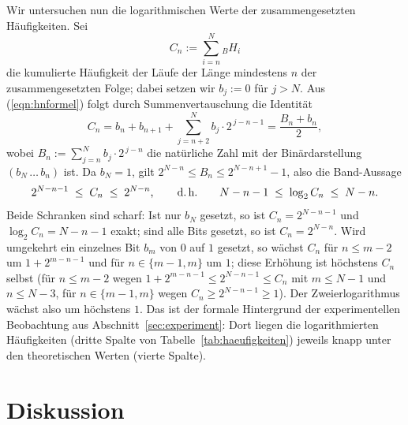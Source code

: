\documentclass[11pt,a4paper]{scrartcl}
\theoremstyle{plain}
\theoremstyle{definition}
\theoremstyle{remark}
\begin{document}
\noindent Wir untersuchen nun die logarithmischen Werte der
zusammengesetzten Häufigkeiten. Sei
\begin{equation}
  C_n:=\sum_{i=n}^{N} {_B}H_i
\end{equation}
die kumulierte Häufigkeit der Läufe der Länge mindestens $n$ der
zusammengesetzten Folge; dabei setzen wir $b_j:=0$ für $j>N$. Aus
(\ref{eqn:hnformel}) folgt durch Summenvertauschung die Identität
\begin{equation}\label{eqn:kumulatividentitaet}
  C_n
  = b_n + b_{n+1} + \sum_{j=n+2}^{N} b_j\cdot 2^{\,j-n-1}
  = \frac{B_n+b_n}{2},
\end{equation}
wobei $B_n:=\sum_{j=n}^{N} b_j\cdot 2^{\,j-n}$ die natürliche Zahl mit
der Binärdarstellung $(b_N\,\dots\,b_n)$ ist. Da $b_N=1$, gilt
$2^{N-n}\leq B_n\leq 2^{N-n+1}-1$, also die Band-Aussage
\begin{equation}\label{eqn:logband}
  2^{N-n-1}\;\leq\; C_n \;\leq\; 2^{N-n},
  \qquad\text{d.\,h.}\qquad
  N-n-1\;\leq\;\log_2 C_n\;\leq\;N-n.
\end{equation}
Beide Schranken sind scharf: Ist nur $b_N$ gesetzt, so ist
$C_n=2^{N-n-1}$ und $\log_2 C_n=N-n-1$ exakt; sind alle Bits gesetzt,
so ist $C_n=2^{N-n}$. Wird umgekehrt ein einzelnes Bit $b_m$ von $0$
auf $1$ gesetzt, so wächst $C_n$ für $n\leq m-2$ um
$1+2^{m-n-1}$ und für $n\in\{m-1,m\}$ um $1$; diese Erhöhung ist
höchstens $C_n$ selbst (für $n\leq m-2$ wegen
$1+2^{m-n-1}\leq 2^{N-n-1}\leq C_n$ mit $m\leq N-1$ und $n\leq N-3$,
für $n\in\{m-1,m\}$ wegen $C_n\geq 2^{N-n-1}\geq 1$). Der
Zweierlogarithmus wächst also um höchstens $1$. Das ist der formale
Hintergrund der experimentellen Beobachtung aus
Abschnitt~\ref{sec:experiment}: Dort liegen die logarithmierten
Häufigkeiten (dritte Spalte von Tabelle~\ref{tab:haeufigkeiten})
jeweils knapp unter den theoretischen Werten (vierte Spalte).

\section{Diskussion}\label{sec:diskussion}
\end{document}
